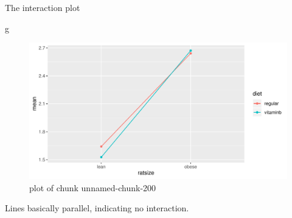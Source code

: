 \documentclass[ignorenonframetext,]{beamer}
\newenvironment{Shaded}{\begin{snugshade}}{\end{snugshade}}
\newcommand{\NormalTok}[1]{#1}
\begin{document}
\begin{frame}[fragile]{The interaction plot}
\protect\hypertarget{the-interaction-plot}{}

\begin{Shaded}
\begin{Highlighting}[]
\NormalTok{g}
\end{Highlighting}
\end{Shaded}

\begin{figure}
\centering
\includegraphics{figure/unnamed-chunk-200-1.pdf}
\caption{plot of chunk unnamed-chunk-200}
\end{figure}

Lines basically parallel, indicating no interaction.

\end{frame}
\end{document}
